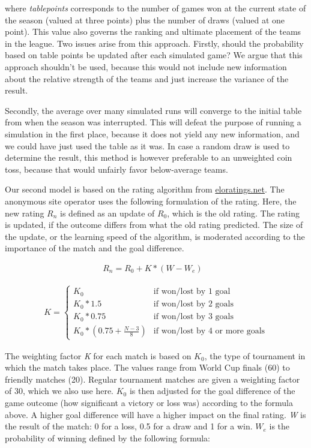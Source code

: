 \documentclass[12pt,a4paper]{article}
\begin{document}
where \emph{tablepoints} corresponds to the number of games won at the
current state of the season (valued at three points) plus the number of
draws (valued at one point). This value also governs the ranking and
ultimate placement of the teams in the league. Two issues arise from
this approach. Firstly, should the probability based on table points be
updated after each simulated game? We argue that this approach shouldn't
be used, because this would not include new information about the
relative strength of the teams and just increase the variance of the
result.

Secondly, the average over many simulated runs will converge to the
initial table from when the season was interrupted. This will defeat the
purpose of running a simulation in the first place, because it does not
yield any new information, and we could have just used the table as it
was. In case a random draw is used to determine the result, this method
is however preferable to an unweighted coin toss, because that would
unfairly favor below-average teams.

Our second model is based on the rating algorithm from
\href{eloratings.net/about}{eloratings.net}. The anonymous site operator
uses the following formulation of the rating. Here, the new rating
\(R_n\) is defined as an update of \(R_0\), which is the old rating. The
rating is updated, if the outcome differs from what the old rating
predicted. The size of the update, or the learning speed of the
algorithm, is moderated according to the importance of the match and the
goal difference.

\begin{align}
R_n = R_0 + K * (W - W_e) &
\end{align}

\begin{align}
K = \begin{cases}
    K_0         &\mbox{if won/lost by 1 goal} \\
    K_0 * 1.5   &\mbox{if won/lost by 2 goals} \\
    K_0 * 0.75  &\mbox{if won/lost by 3 goals} \\
    K_0 * \left( 0.75 + \frac{N-3}{8} \right) &\mbox{if won/lost by 4 or more goals}
  \end{cases}
\end{align}

The weighting factor \emph{K} for each match is based on \(K_0\), the
type of tournament in which the match takes place. The values range from
World Cup finals (60) to friendly matches (20). Regular tournament
matches are given a weighting factor of 30, which we also use here.
\(K_0\) is then adjusted for the goal difference of the game outcome
(how significant a victory or loss was) according to the formula above.
A higher goal difference will have a higher impact on the final rating.
\emph{W} is the result of the match: 0 for a loss, 0.5 for a draw and 1
for a win. \(W_e\) is the probability of winning defined by the
following formula:
\end{document}
